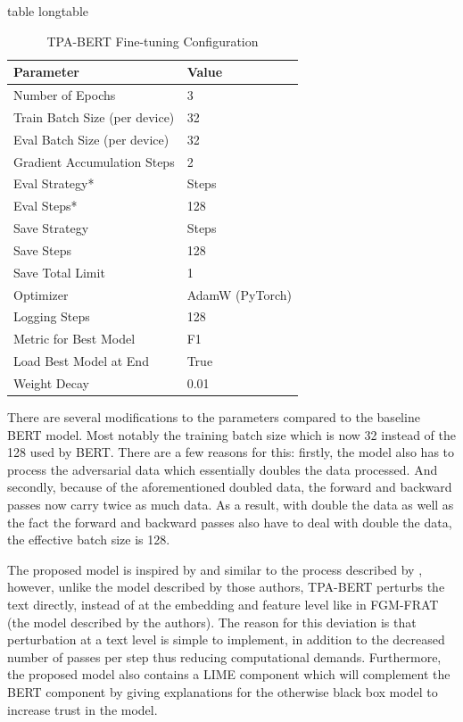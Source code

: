 \documentclass[stu,12pt,floatsintext,donotrepeattitle]{apa7}
\makeatletter
\let\origcaption\caption
\newcommand{\@tabletype}{table}
\newcommand{\@longtabletype}{longtable}
\DeclareRobustCommand{\caption}[2][]{%
    \ifx\relax#1\relax
      \origcaption{#2}%
      \def\temp@cap{#2}%
    \else
      \origcaption[#1]{#2}%
      \def\temp@cap{#1}%
    \fi
    \ifx\@captype\@tabletype
      \ifx\@currenvir\@longtabletype\else
        \addcontentsline{lot}{table}{\protect\numberline{\thetable}{\ignorespaces\temp@cap}}%
      \fi
    \fi
  }%
\let\oldcaption\caption
\renewcommand{\caption}[2][]{%
    \oldcaption[#1]{#2}%
    \vspace{-12pt}%
  }%
\makeatother
\begin{document}
\begin{table}[H]
    \centering
    \caption{TPA-BERT Fine-tuning Configuration}
    \label{tab:tpa_bert_finetune_config}
    \begin{tabular}{l l}
        \hline
        \textbf{Parameter} & \textbf{Value} \\
        \hline
        Number of Epochs & 3 \\
        Train Batch Size (per device) & 32 \\
        Eval Batch Size (per device) & 32 \\
        Gradient Accumulation Steps & 2 \\
        Eval Strategy* & Steps \\
        Eval Steps* & 128 \\
        Save Strategy & Steps \\
        Save Steps & 128 \\
        Save Total Limit & 1 \\
        Optimizer & AdamW (PyTorch) \\
        Logging Steps & 128 \\
        Metric for Best Model & F1 \\
        Load Best Model at End & True \\
        Weight Decay & 0.01 \\
        \hline
    \end{tabular}
\end{table}

There are several modifications to the parameters compared to the baseline BERT model. Most notably the training batch size which is now 32 instead of the 128 used by BERT. There are a few reasons for this: firstly, the model also has to process the adversarial data which essentially doubles the data processed. And secondly, because of the aforementioned doubled data, the forward and backward passes now carry twice as much data. As a result, with double the data as well as the fact the forward and backward passes also have to deal with double the data, the effective batch size is 128. 

The proposed model is inspired by and similar to the process described by \textcite{BERT-finetuning}, however, unlike the model described by those authors, TPA-BERT perturbs the text directly, instead of at the embedding and feature level like in FGM-FRAT (the model described by the authors). The reason for this deviation is that perturbation at a text level is simple to implement, in addition to the decreased number of passes per step thus reducing computational demands. Furthermore, the proposed model also contains a LIME component which will complement the BERT component by giving explanations for the otherwise black box model to increase trust in the model. 
\end{document}
